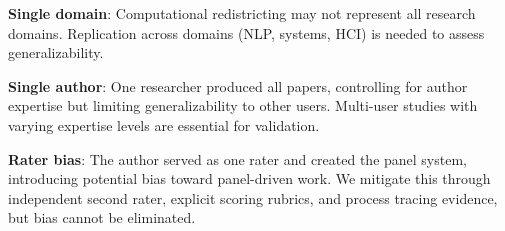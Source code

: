 \textbf{Single domain}: Computational redistricting may not represent all research domains. Replication across domains (NLP, systems, HCI) is needed to assess generalizability.

\textbf{Single author}: One researcher produced all papers, controlling for author expertise but limiting generalizability to other users. Multi-user studies with varying expertise levels are essential for validation.

\textbf{Rater bias}: The author served as one rater and created the panel system, introducing potential bias toward panel-driven work. We mitigate this through independent second rater, explicit scoring rubrics, and process tracing evidence, but bias cannot be eliminated.

